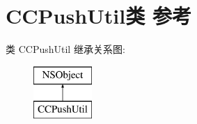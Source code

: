 \hypertarget{interface_c_c_push_util}{}\section{C\+C\+Push\+Util类 参考}
\label{interface_c_c_push_util}
类 C\+C\+Push\+Util 继承关系图\+:\begin{figure}[H]
\begin{center}
\leavevmode
\includegraphics[height=2.000000cm]{interface_c_c_push_util}
\end{center}
\end{figure}
